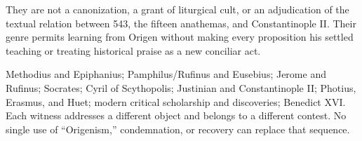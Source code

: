 They are not a canonization, a grant of liturgical cult, or an adjudication of
the textual relation between 543, the fifteen anathemas, and Constantinople II.
Their genre permits learning from Origen without making every proposition his
settled teaching or treating historical praise as a new conciliar act.

{Methodius and Epiphanius; Pamphilus/Rufinus and Eusebius; Jerome and Rufinus;
Socrates; Cyril of Scythopolis; Justinian and Constantinople II; Photius,
Erasmus, and Huet; modern critical scholarship and discoveries; Benedict XVI.}
{Each witness addresses a different object and belongs to a different contest.
No single use of ``Origenism,'' condemnation, or recovery can replace that
sequence.}
